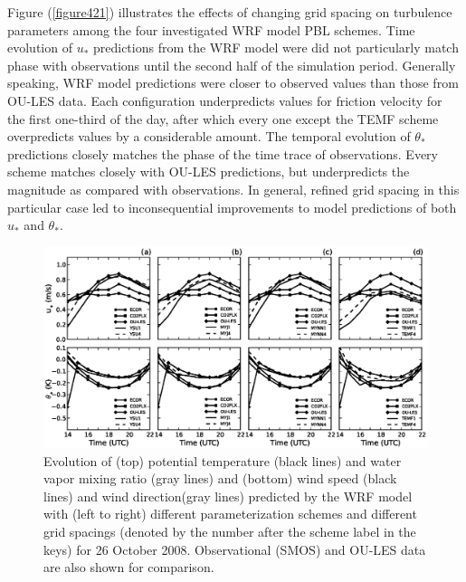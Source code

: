 Figure (\autoref{figure421}) illustrates the effects of changing grid spacing on turbulence parameters among the four investigated WRF model PBL schemes. Time evolution of $u_*$ predictions from the WRF model were did not particularly match phase with observations until the second half of the simulation period. Generally speaking, WRF model predictions were closer to observed values than those from OU-LES data. Each configuration underpredicts values for friction velocity for the first one-third of the day, after which every one except the TEMF scheme overpredicts values by a considerable amount. The temporal evolution of $\theta_*$ predictions closely matches the phase of the time trace of observations. Every scheme matches closely with OU-LES predictions, but underpredicts the magnitude as compared with observations. In general, refined grid spacing in this particular case led to inconsequential improvements to model predictions of both $u_*$ and $\theta_*$. 


\begin{figure}[ht!]
\begin{center}
\includegraphics[width=\textwidth]{figures/chapter4/ust_tst_grid_20081026}
\end{center}
\caption{Evolution of (top) potential temperature (black lines) and water vapor mixing ratio (gray lines) and (bottom) wind speed (black lines) and wind direction(gray lines) predicted by the WRF model with (left to right) different parameterization schemes and different grid spacings (denoted by the number after the scheme label in the keys) for 26 October 2008. Observational (SMOS) and OU-LES data are also shown for comparison.}
\label{figure421}
\end{figure}



